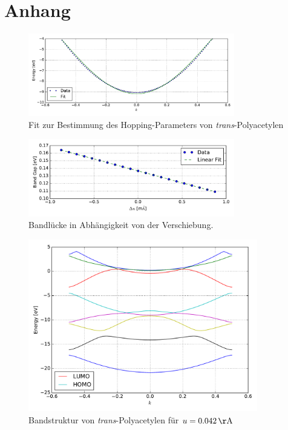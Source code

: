 \section*{Anhang}

\begin{frame}
\begin{figure}
	\centering
	\includegraphics[width = 9cm]{Images/polyacetylene/bands/band_fit}
	\caption{Fit zur Bestimmung des Hopping-Parameters von \emph{trans}-Polyacetylen}
	\label{image_band_fit_t0}
\end{figure}
\vspace*{-0.5cm}

\begin{figure}
	\centering
	\includegraphics[width = 9cm]{Images/polyacetylene/bands/alpha}
	\caption{Bandlücke in Abhängigkeit von der Verschiebung.}
	\label{image_alpha_fit}
\end{figure}
\end{frame}

\begin{frame}
\begin{figure}
	\centering
	\includegraphics[width = 10cm]{Images/polyacetylene/bands/bandstructure_manually_displaced}
	\caption{Bandstruktur von \emph{trans}-Polyacetylen für $u = \unit[0.042]{\AA}$}
	\label{image_manually_displaced_poly_bandstructure}
\end{figure}
\end{frame}